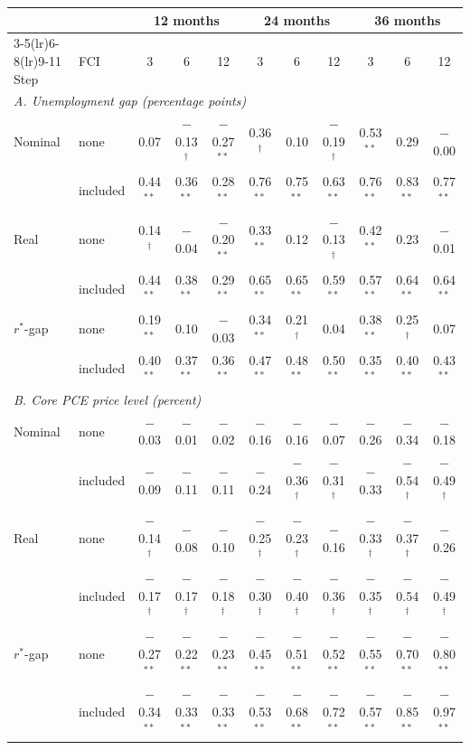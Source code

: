 \begin{tabular}{llccccccccc}
\toprule
 & & \multicolumn{3}{c}{12 months} & \multicolumn{3}{c}{24 months} & \multicolumn{3}{c}{36 months}\\
\cmidrule(lr){3-5}\cmidrule(lr){6-8}\cmidrule(lr){9-11}
Step & FCI & 3 & 6 & 12 & 3 & 6 & 12 & 3 & 6 & 12 \\
\midrule
\multicolumn{11}{l}{\textit{A. Unemployment gap (percentage points)}}\\
Nominal & none & 0.07 & $-$0.13$^{\dagger}$ & $-$0.27$^{**}$ & 0.36$^{\dagger}$ & 0.10 & $-$0.19$^{\dagger}$ & 0.53$^{**}$ & 0.29 & $-$0.00 \\
 & included & 0.44$^{**}$ & 0.36$^{**}$ & 0.28$^{**}$ & 0.76$^{**}$ & 0.75$^{**}$ & 0.63$^{**}$ & 0.76$^{**}$ & 0.83$^{**}$ & 0.77$^{**}$ \\
Real & none & 0.14$^{\dagger}$ & $-$0.04 & $-$0.20$^{**}$ & 0.33$^{**}$ & 0.12 & $-$0.13$^{\dagger}$ & 0.42$^{**}$ & 0.23 & $-$0.01 \\
 & included & 0.44$^{**}$ & 0.38$^{**}$ & 0.29$^{**}$ & 0.65$^{**}$ & 0.65$^{**}$ & 0.59$^{**}$ & 0.57$^{**}$ & 0.64$^{**}$ & 0.64$^{**}$ \\
$r^*$-gap & none & 0.19$^{**}$ & 0.10 & $-$0.03 & 0.34$^{**}$ & 0.21$^{\dagger}$ & 0.04 & 0.38$^{**}$ & 0.25$^{\dagger}$ & 0.07 \\
 & included & 0.40$^{**}$ & 0.37$^{**}$ & 0.36$^{**}$ & 0.47$^{**}$ & 0.48$^{**}$ & 0.50$^{**}$ & 0.35$^{**}$ & 0.40$^{**}$ & 0.43$^{**}$ \\
\midrule
\multicolumn{11}{l}{\textit{B. Core PCE price level (percent)}}\\
Nominal & none & $-$0.03 & $-$0.01 & $-$0.02 & $-$0.16 & $-$0.16 & $-$0.07 & $-$0.26 & $-$0.34 & $-$0.18 \\
 & included & $-$0.09 & $-$0.11 & $-$0.11 & $-$0.24 & $-$0.36$^{\dagger}$ & $-$0.31$^{\dagger}$ & $-$0.33 & $-$0.54$^{\dagger}$ & $-$0.49$^{\dagger}$ \\
Real & none & $-$0.14$^{\dagger}$ & $-$0.08 & $-$0.10 & $-$0.25$^{\dagger}$ & $-$0.23$^{\dagger}$ & $-$0.16 & $-$0.33$^{\dagger}$ & $-$0.37$^{\dagger}$ & $-$0.26 \\
 & included & $-$0.17$^{\dagger}$ & $-$0.17$^{\dagger}$ & $-$0.18$^{\dagger}$ & $-$0.30$^{\dagger}$ & $-$0.40$^{\dagger}$ & $-$0.36$^{\dagger}$ & $-$0.35$^{\dagger}$ & $-$0.54$^{\dagger}$ & $-$0.49$^{\dagger}$ \\
$r^*$-gap & none & $-$0.27$^{**}$ & $-$0.22$^{**}$ & $-$0.23$^{**}$ & $-$0.45$^{**}$ & $-$0.51$^{**}$ & $-$0.52$^{**}$ & $-$0.55$^{**}$ & $-$0.70$^{**}$ & $-$0.80$^{**}$ \\
 & included & $-$0.34$^{**}$ & $-$0.33$^{**}$ & $-$0.33$^{**}$ & $-$0.53$^{**}$ & $-$0.68$^{**}$ & $-$0.72$^{**}$ & $-$0.57$^{**}$ & $-$0.85$^{**}$ & $-$0.97$^{**}$ \\
\bottomrule
\end{tabular}
